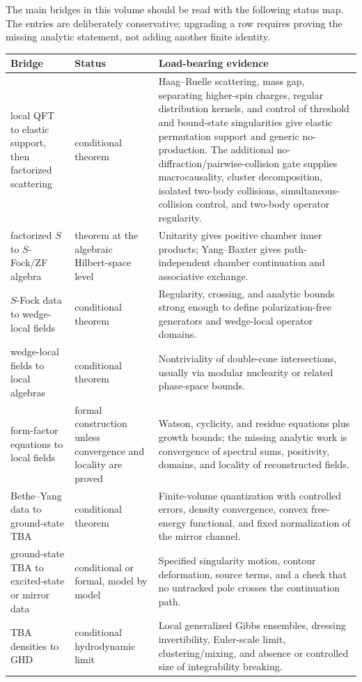 The main bridges in this volume should be read with the following status map.
The entries are deliberately conservative; upgrading a row requires proving the
missing analytic statement, not adding another finite identity.
\begin{center}
\small
\begin{tabular}{@{}>{\raggedright\arraybackslash}p{}
  >{\raggedright\arraybackslash}p{}
  >{\raggedright\arraybackslash}p{}@{}}
\textbf{Bridge} & \textbf{Status} & \textbf{Load-bearing evidence} \\
\hline
local QFT to elastic support, then factorized scattering
& conditional theorem
& Haag--Ruelle scattering, mass gap, separating higher-spin charges,
regular distribution kernels, and control of threshold and bound-state
singularities give elastic permutation support and generic no-production.
The additional no-diffraction/pairwise-collision gate supplies macrocausality,
cluster decomposition, isolated two-body collisions, simultaneous-collision
control, and two-body operator regularity. \\
factorized \(S\) to \(S\)-Fock/ZF algebra
& theorem at the algebraic Hilbert-space level
& Unitarity gives positive chamber inner products; Yang--Baxter gives
path-independent chamber continuation and associative exchange. \\
\(S\)-Fock data to wedge-local fields
& conditional theorem
& Regularity, crossing, and analytic bounds strong enough to define
polarization-free generators and wedge-local operator domains. \\
wedge-local fields to local algebras
& conditional theorem
& Nontriviality of double-cone intersections, usually via modular nuclearity
or related phase-space bounds. \\
form-factor equations to local fields
& formal construction unless convergence and locality are proved
& Watson, cyclicity, and residue equations plus growth bounds; the
missing analytic work is convergence of spectral sums, positivity, domains,
and locality of reconstructed fields. \\
Bethe--Yang data to ground-state TBA
& conditional theorem
& Finite-volume quantization with controlled errors, density convergence,
convex free-energy functional, and fixed normalization of the mirror channel. \\
ground-state TBA to excited-state or mirror data
& conditional or formal, model by model
& Specified singularity motion, contour deformation, source terms, and a check
that no untracked pole crosses the continuation path. \\
TBA densities to GHD
& conditional hydrodynamic limit
& Local generalized Gibbs ensembles, dressing invertibility, Euler-scale
limit, clustering/mixing, and absence or controlled size of integrability
breaking.
\end{tabular}
\end{center}


